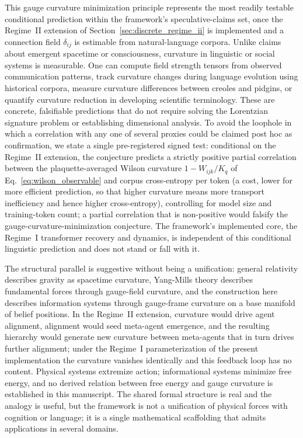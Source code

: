 \documentclass[11pt]{article}
\begin{document}
This gauge curvature minimization principle represents the most readily testable conditional prediction within the framework's speculative-claims set, once the Regime~II extension of Section~\ref{sec:discrete_regime_ii} is implemented and a connection field $\delta_{ij}$ is estimable from natural-language corpora. Unlike claims about emergent spacetime or consciousness, curvature in linguistic or social systems is measurable. One can compute field strength tensors from observed communication patterns, track curvature changes during language evolution using historical corpora, measure curvature differences between creoles and pidgins, or quantify curvature reduction in developing scientific terminology. These are concrete, falsifiable predictions that do not require solving the Lorentzian signature problem or establishing dimensional analysis. To avoid the loophole in which a correlation with any one of several proxies could be claimed post hoc as confirmation, we state a single pre-registered signed test: conditional on the Regime~II extension, the conjecture predicts a strictly positive partial correlation between the plaquette-averaged Wilson curvature $1 - W_{ijk}/K_q$ of Eq.~\eqref{eq:wilson_observable} and corpus cross-entropy per token (a cost, lower for more efficient prediction, so that higher curvature means more transport inefficiency and hence higher cross-entropy), controlling for model size and training-token count; a partial correlation that is non-positive would falsify the gauge-curvature-minimization conjecture. The framework's implemented core, the Regime~I transformer recovery and dynamics, is independent of this conditional linguistic prediction and does not stand or fall with it.

The structural parallel is suggestive without being a unification: general relativity describes gravity as spacetime curvature, Yang-Mills theory describes fundamental forces through gauge-field curvature, and the construction here describes information systems through gauge-frame curvature on a base manifold of belief positions. In the Regime~II extension, curvature would drive agent alignment, alignment would seed meta-agent emergence, and the resulting hierarchy would generate new curvature between meta-agents that in turn drives further alignment; under the Regime~I parameterization of the present implementation the curvature vanishes identically and this feedback loop has no content. Physical systems extremize action; informational systems minimize free energy, and no derived relation between free energy and gauge curvature is established in this manuscript. The shared formal structure is real and the analogy is useful, but the framework is not a unification of physical forces with cognition or language; it is a single mathematical scaffolding that admits applications in several domains.
\end{document}
